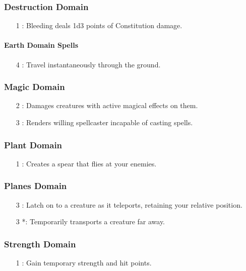 \subsubsection{Destruction Domain}
\begin{itemize}
 \item[1] : Bleeding deals 1d3 points of Constitution damage.
\end{itemize}
\paragraph{Earth Domain Spells}
\begin{itemize}
 \item[4] : Travel instantaneously through the ground.
\end{itemize}
\subsubsection{Magic Domain}
\begin{itemize}
 \item[2] : Damages creatures with active magical effects on them.
 \item[3] : Renders willing spellcaster incapable of casting spells.
\end{itemize}
\subsubsection{Plant Domain}
\begin{itemize}
 \item[1] : Creates a spear that flies at your enemies.
\end{itemize}
\subsubsection{Planes Domain}
\begin{itemize}
 \item[3] : Latch on to a creature as it teleports, retaining your relative position.
 \item[3] *: Temporarily transports a creature far away.
\end{itemize}
\subsubsection{Strength Domain}
\begin{itemize}
 \item[1] : Gain temporary strength and hit points.
\end{itemize}
